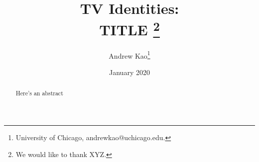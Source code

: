 \documentclass[11pt]{article}
\begin{document}
\title{\textbf{TV Identities: \\ TITLE}%
\thanks{We would like to thank XYZ.}\\
}



\author{Andrew Kao\thanks{University of Chicago, andrewkao@uchicago.edu.} }

\date{January 2020}
{\vspace{-5ex}}


\maketitle

\begin{abstract}



\noindent Here's an abstract
\noindent
\\
\end{abstract}




\newsavebox{\tablebox} \newlength{\tableboxwidth}

\setlength{\baselineskip}{22pt}
\end{document}
